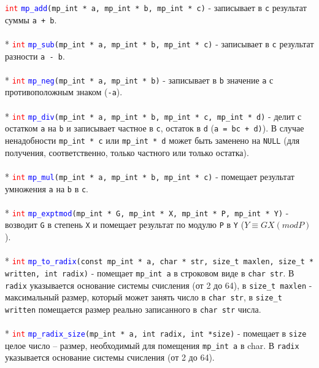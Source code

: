 \documentclass[12pt]{article}
\begin{document}
\textcolor{red}{\texttt{int}} \textcolor{blue}{\texttt{mp\_add}}\texttt{(mp\_int * a, mp\_int * b, mp\_int * c)} - записывает в \texttt{c} результат суммы \texttt{a + b}.\\
\\*
\textcolor{red}{\texttt{int}} \textcolor{blue}{\texttt{mp\_sub}}\texttt{(mp\_int * a, mp\_int * b, mp\_int * c)} - записывает в \texttt{с} результат разности \texttt{a - b}.\\
\\*
\textcolor{red}{\texttt{int}} \textcolor{blue}{\texttt{mp\_neg}}\texttt{(mp\_int * a, mp\_int * b)} - записывает в \texttt{b} значение \texttt{a} с противоположным знаком (\texttt{-a}).\\
\\*
\textcolor{red}{\texttt{int}} \textcolor{blue}{\texttt{mp\_div}}\texttt{(mp\_int * a, mp\_int * b, mp\_int * c, mp\_int * d)} - делит с остатком \texttt{a} на \texttt{b} и записывает частное в \texttt{c}, остаток в \texttt{d} (\texttt{a = bc + d)}). В случае ненадобности \texttt{mp\_int * c} или \texttt{mp\_int * d} может быть заменено на \texttt{NULL} (для получения, соответственно, только частного или только остатка). \\
\\*
\textcolor{red}{\texttt{int}} \textcolor{blue}{\texttt{mp\_mul}}\texttt{(mp\_int * a, mp\_int * b, mp\_int * c)} - помещает результат умножения \texttt{a} на \texttt{b} в \texttt{c}.\\
\\*
\textcolor{red}{\texttt{int}} \textcolor{blue}{\texttt{mp\_exptmod}}\texttt{(mp\_int * G, mp\_int * X, mp\_int * P, mp\_int * Y)} - возводит \texttt{G} в степень \texttt{Х} и помещает результат по модулю \texttt{Р} в \texttt{Y} (\texttt{$Y \equiv G X (mod P)$}).\\
\\*
\textcolor{red}{\texttt{int}} \textcolor{blue}{\texttt{mp\_to\_radix}}\texttt{(const mp\_int * a, char * str, size\_t maxlen, size\_t * written, int radix)} - помещает \texttt{mp\_int a} в строковом виде в \texttt{char str}. В \texttt{radix} указывается основание системы счисления (от 2 до 64), в \texttt{size\_t maxlen} - максимальный размер, который может занять число в \texttt{char str}, в \texttt{size\_t written} помещается размер реально записанного в \texttt{char str} числа.\\
\\*
\textcolor{red}{\texttt{int}} \textcolor{blue}{\texttt{mp\_radix\_size}}\texttt{(mp\_int * a, int radix, int *size)} - помещает в \texttt{size} целое число – размер, необходимый для помещения \texttt{mp\_int а} в char. В \texttt{radix} указывается основание системы счисления (от 2 до 64). \\
\end{document}
